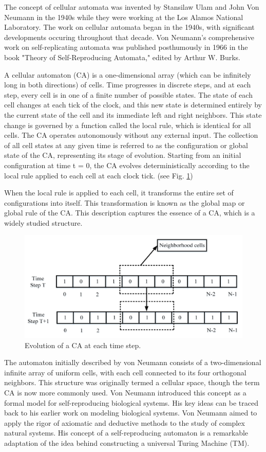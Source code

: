 \documentclass[9pt,a4paper,twoside]{tau-class/tau}
\begin{document}
    The concept of cellular automata was invented by Stansilaw Ulam and John Von Neumann in
    the 1940s while they were working at the Los Alamos National Laboratory.
    The work on cellular automata began in the 1940s, with significant developments occuring throughout
    that decade. Von Neumann’s comprehensive work on self-replicating automata was published 
    posthumously in 1966 in the book "Theory of Self-Reproducing Automata," edited by 
    Arthur W. Burks.

    A cellular automaton (CA) is a one-dimensional array (which can be infinitely long in both directions) of cells. 
    Time progresses in discrete steps, and at each step, every cell is in one of a finite number of possible states. The state of each cell changes at each tick of the clock, and this new state is determined entirely by the current state of the cell and its immediate left and right neighbors. 
    This state change is governed by a function called the local rule, which is identical for all cells. 
    The CA operates autonomously without any external input. 
    The collection of all cell states at any given time is referred to as the configuration or global state of the CA, 
    representing its stage of evolution. Starting from an initial configuration at time t = 0, the CA evolves deterministically according to the local rule applied to each cell at each clock tick. (see Fig. \ref{fig:timeStep})

    When the local rule is applied to each cell, it transforms the entire set of configurations into itself. 
    This transformation is known as the global map or global rule of the CA. This description captures the essence of a CA, which is a widely studied structure.
    \begin{figure}[H]
        \centering
        \includegraphics[width=0.75\columnwidth]{figures/timestep.png}
        \caption{Evolution of a CA at each time step. \cite{math11102322} }
        \label{fig:timeStep}
    \end{figure}

    The automaton initially described by von Neumann\cite{von-neumann-automata} consists of a two-dimensional infinite array of uniform cells, with each cell connected to its four orthogonal neighbors. 
    This structure was originally termed a cellular space, though the term CA is now more commonly used. Von Neumann introduced this concept as a formal model for self-reproducing biological systems. His key ideas can be traced back to his earlier work on modeling biological systems. 
    Von Neumann aimed to apply the rigor of axiomatic and deductive methods to the study of complex natural systems. His concept of a self-reproducing automaton is a remarkable adaptation of the idea behind constructing a universal Turing Machine (TM).
\end{document}

